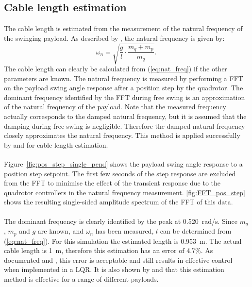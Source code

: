 \subsection{Cable length estimation} \label{sec:length_estimation}

    \paragraph{}
    The cable length is estimated from the measurement of the natural frequency of the swinging payload.
    As described by
    \cite{Bisgaard2008}, the natural frequency is given by:
    \begin{equation} \label{eq:nat_freq}
        \omega_n = \sqrt{ \frac{g}{l} \cdot \frac{m_q + m_p}{m_q}} .
    \end{equation}
    The cable length can clearly be calculated from (\ref{eq:nat_freq}) if the other parameters are known.
    The natural frequency is measured by performing a FFT on the payload swing angle response 
    after a position step by the quadrotor.
    The dominant frequency identified by the FFT during free swing is an approximation 
    of the natural frequency of the payload.
    Note that the measured frequency actually corresponds to the damped natural frequency, 
    but it is assumed that the damping during free swing is negligible.
    Therefore the damped natural frequency closely approximates the natural frequency.
    This method is applied successfully by \cite{Erasmus2020} and \cite{Slabber2020} for cable length estimation.
    
    \paragraph{}
    Figure~\ref{fig:pos_step_single_pend} shows the payload swing angle response 
    to a position step setpoint.
    The first few seconds of the step response are excluded from the FFT 
    to minimise the effect of the transient response due to the quadrotor controllers 
    in the natural frequency measurement.
    \ref{fig:FFT_pos_step} shows the resulting single-sided amplitude spectrum of the FFT of this data.
    
    \paragraph{}
    The dominant frequency is clearly identified by the peak at \SI{0.520}{\radian/\second}.
    Since $m_q$, $m_p$ and $g$ are known, and $\omega_n$ has been measured, 
    $l$ can be determined from (\ref{eq:nat_freq}).
    For this simulation the estimated length is \SI{0.953}{\metre}.
    The actual cable length is \SI{1}{\metre}, therefore this estimation has an error of 4.7\%.
    As documented \cite{Erasmus2020} and \cite{Slabber2020}, this error is acceptable
    and still results in effective control when implemented in a LQR.
    It is also shown by \cite{Erasmus2020} and \cite{Slabber2020} that this estimation method 
    is effective for a range of different payloads.

    

    

